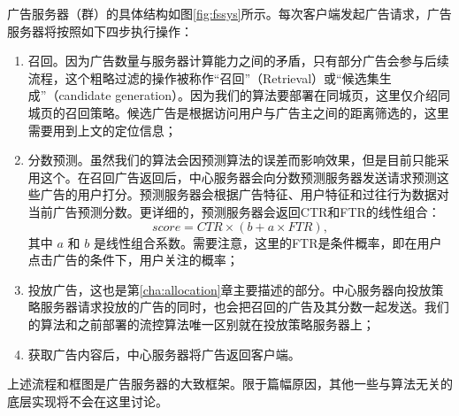 广告服务器（群）的具体结构如图\ref{fig:fssys}所示。每次客户端发起广告请求，广告服务器将按照如下四步执行操作：
\begin{enumerate}
	\item 召回。因为广告数量与服务器计算能力之间的矛盾，只有部分广告会参与后续流程，这个粗略过滤的操作被称作“召回”（Retrieval）或“候选集生成”（candidate generation）。因为我们的算法要部署在同城页，这里仅介绍同城页的召回策略。候选广告是根据访问用户与广告主之间的距离筛选的，这里需要用到上文的定位信息；
	\item 分数预测。虽然我们的算法会因预测算法的误差而影响效果，但是目前只能采用这个。在召回广告返回后，中心服务器会向分数预测服务器发送请求预测这些广告的用户打分。预测服务器会根据广告特征、用户特征和过往行为数据对当前广告预测分数。更详细的，预测服务器会返回CTR和FTR的线性组合：
	\begin{equation}
		score = CTR \times  (b + a \times FTR), \label{eq:score}
	\end{equation}
	其中 $a$ 和 $b$ 是线性组合系数。需要注意，这里的FTR是条件概率，即在用户点击广告的条件下，用户关注的概率；
	\item 投放广告，这也是第\ref{cha:allocation}章主要描述的部分。中心服务器向投放策略服务器请求投放的广告的同时，也会把召回的广告及其分数一起发送。我们的算法和之前部署的流控算法唯一区别就在投放策略服务器上；
	\item 获取广告内容后，中心服务器将广告返回客户端。
\end{enumerate}

上述流程和框图是广告服务器的大致框架。限于篇幅原因，其他一些与算法无关的底层实现将不会在这里讨论。






